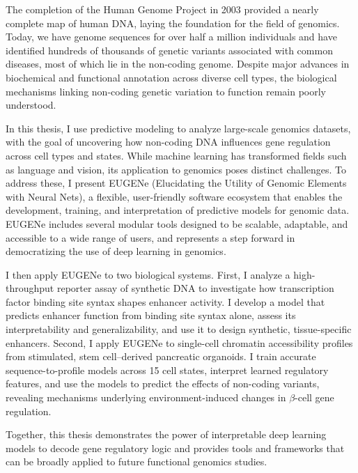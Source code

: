 \documentclass[11pt]{formatting-template}
\begin{document}
\begin{dissertationabstract}

		The completion of the Human Genome Project in 2003 provided a nearly complete map of human DNA, laying the foundation for the field of genomics. Today, we have genome sequences for over half a million individuals and have identified hundreds of thousands of genetic variants associated with common diseases, most of which lie in the non-coding genome. Despite major advances in biochemical and functional annotation across diverse cell types, the biological mechanisms linking non-coding genetic variation to function remain poorly understood.

		In this thesis, I use predictive modeling to analyze large-scale genomics datasets, with the goal of uncovering how non-coding DNA influences gene regulation across cell types and states. While machine learning has transformed fields such as language and vision, its application to genomics poses distinct challenges. To address these, I present EUGENe (Elucidating the Utility of Genomic Elements with Neural Nets), a flexible, user-friendly software ecosystem that enables the development, training, and interpretation of predictive models for genomic data. EUGENe includes several modular tools designed to be scalable, adaptable, and accessible to a wide range of users, and represents a step forward in democratizing the use of deep learning in genomics.

		I then apply EUGENe to two biological systems. First, I analyze a high-throughput reporter assay of synthetic DNA to investigate how transcription factor binding site syntax shapes enhancer activity. I develop a model that predicts enhancer function from binding site syntax alone, assess its interpretability and generalizability, and use it to design synthetic, tissue-specific enhancers. Second, I apply EUGENe to single-cell chromatin accessibility profiles from stimulated, stem cell–derived pancreatic organoids. I train accurate sequence-to-profile models across 15 cell states, interpret learned regulatory features, and use the models to predict the effects of non-coding variants, revealing mechanisms underlying environment-induced changes in $\beta$-cell gene regulation.

		Together, this thesis demonstrates the power of interpretable deep learning models to decode gene regulatory logic and provides tools and frameworks that can be broadly applied to future functional genomics studies.

\end{dissertationabstract}
\end{document}
